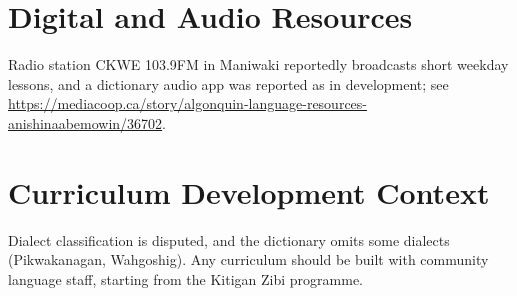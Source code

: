 \documentclass[12pt]{article}
\begin{document}
\section{Digital and Audio Resources}
Radio station CKWE 103.9FM in Maniwaki reportedly broadcasts short weekday lessons, and a dictionary audio app was reported as in development; see \url{https://mediacoop.ca/story/algonquin-language-resources-anishinaabemowin/36702}.

\section{Curriculum Development Context}
Dialect classification is disputed, and the dictionary omits some dialects (Pikwakanagan, Wahgoshig). Any curriculum should be built with community language staff, starting from the Kitigan Zibi programme.
\end{document}
